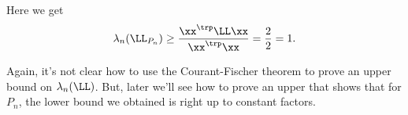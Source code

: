 Here we get
\begin{align}\label{eq:testvectorbounds}
\lambda_n(\LL_{P_n}) \geq \frac{ \xx^\trp \LL \xx}{ \xx^\trp \xx} = \frac{2}{2} = 1.
\end{align}

Again, it's not clear how to use the Courant-Fischer theorem to prove
an upper bound on $\lambda_n(\LL) $.
But, later we'll see how to prove an upper that shows that
for $P_n$, the lower bound we obtained is right up to constant factors.



